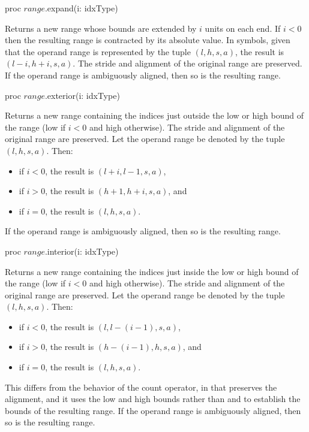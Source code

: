 \begin{protohead}
proc $range$.expand(i: idxType)
\end{protohead}
\begin{protobody}
Returns a new range whose bounds are extended by $i$ units on each end.  If $i <
0$ then the resulting range is contracted by its absolute value.  In symbols,
given that the operand range is represented by the tuple $(l,h,s,a)$, the result
is $(l-i,h+i,s,a)$.  The stride and alignment of the original range are preserved.
If the operand range is ambiguously aligned, then so is the resulting range.
\end{protobody}

\begin{protohead}
proc $range$.exterior(i: idxType)
\end{protohead}
\begin{protobody}
Returns a new range containing the indices just outside the low or high bound of
the range (low if $i < 0$ and high otherwise).  The stride and alignment of the
original range are preserved.  Let the operand range
be denoted by the tuple $(l,h,s,a)$.  Then:
\begin{itemize}
\item[] if $i < 0$, the result is $(l+i,l-1,s,a)$,
\item[] if $i > 0$, the result is $(h+1,h+i,s,a)$, and
\item[] if $i = 0$, the result is $(l,h,s,a)$.
\end{itemize}
If the operand range is ambiguously aligned, then so is the resulting range.
\end{protobody}

\begin{protohead}
proc $range$.interior(i: idxType)
\end{protohead}
\begin{protobody}
Returns a new range containing the indices just inside the low or high bound of
the range (low if $i < 0$ and high otherwise).  The stride and alignment of the
original range are preserved.  Let the operand range
be denoted by the tuple $(l,h,s,a)$.  Then:
\begin{itemize}
\item[] if $i < 0$, the result is $(l,l-(i-1),s,a)$,
\item[] if $i > 0$, the result is $(h-(i-1),h,s,a)$, and
\item[] if $i = 0$, the result is $(l,h,s,a)$.
\end{itemize}
This differs from the behavior of the count operator, in that 
preserves the alignment, and it uses the low and high bounds rather
than  and  to establish the bounds of the resulting range.
If the operand range is ambiguously aligned, then so is the resulting range.
\end{protobody}

